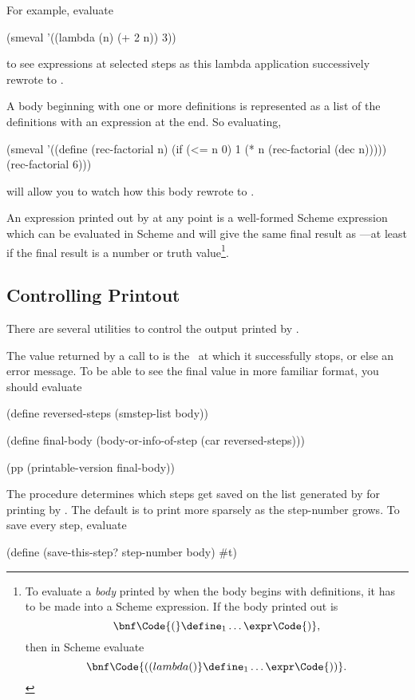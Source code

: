 \documentclass[11pt]{article}
\begin{document}
For example, evaluate
\begin{lisp}
(smeval '((lambda (n) (+ 2 n)) 3))
\end{lisp}
to see expressions at selected steps as this lambda application
successively rewrote to .

A body beginning with one or more definitions is represented as a list of
the definitions with an expression at the end.  So evaluating,
\begin{lisp}
(smeval
 '((define (rec-factorial n)
     (if (<= n 0)
         1
         (* n (rec-factorial (dec n)))))
   (rec-factorial 6)))
\end{lisp}
will allow you to watch how this body rewrote to .

An expression printed out by  at any point is a well-formed
Scheme expression which can be evaluated in Scheme and will give the same
final result as ---at least if the final result is a number
or truth value\footnote{To evaluate a {\em body} printed by 
when the body begins with definitions, it has to be made into a Scheme
expression.  If the body printed out is
\[\bnf \Code{(}\define_{1} \ldots \expr \Code{)}, \]
then in Scheme evaluate
\[\bnf \Code{((lambda () } \define_{1} \ldots \expr\Code{))}.\]}.


\subsection{Controlling Printout}

There are several utilities to control the output printed by .

The value returned by a call to  is the \val\ at
which it successfully stops, or else an error message.  To be able to see
the final value in more familiar format, you should evaluate
\begin{lisp}
(define reversed-steps (smstep-list body))

(define final-body (body-or-info-of-step (car reversed-steps)))

(pp (printable-version final-body))
\end{lisp}

The procedure  determines which steps get saved on
the list generated by  for printing by .
The default is to print more sparsely as the step-number grows.  To save
every step, evaluate
\begin{lisp}
(define (save-this-step? step-number body) #t)
\end{lisp}
\end{document}
